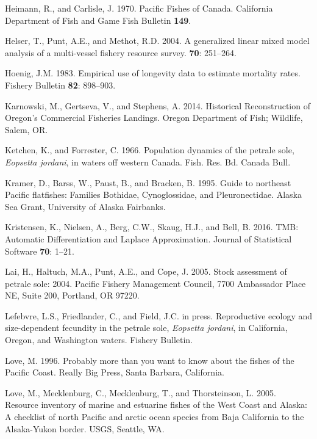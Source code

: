 \documentclass[12pt,]{article}
\begin{document}
\hypertarget{ref-heimann_pacific_1970}{}
Heimann, R., and Carlisle, J. 1970. Pacific Fishes of Canada. California
Department of Fish and Game Fish Bulletin \textbf{149}.

\hypertarget{ref-helser_generalized_2004}{}
Helser, T., Punt, A.E., and Methot, R.D. 2004. A generalized linear
mixed model analysis of a multi-vessel fishery resource survey.
\textbf{70}: 251--264.

\hypertarget{ref-hoenig_empirical_1983}{}
Hoenig, J.M. 1983. Empirical use of longevity data to estimate mortality
rates. Fishery Bulletin \textbf{82}: 898--903.

\hypertarget{ref-karnowski_historical_2014}{}
Karnowski, M., Gertseva, V., and Stephens, A. 2014. Historical
Reconstruction of Oregon's Commercial Fisheries Landings. Oregon
Department of Fish; Wildlife, Salem, OR.

\hypertarget{ref-ketchen_population_1966}{}
Ketchen, K., and Forrester, C. 1966. Population dynamics of the petrale
sole, \emph{Eopsetta jordani}, in waters off western Canada. Fish. Res.
Bd. Canada Bull.

\hypertarget{ref-kramer_guide_1995}{}
Kramer, D., Barss, W., Paust, B., and Bracken, B. 1995. Guide to
northeast Pacific flatfishes: Families Bothidae, Cynoglossidae, and
Pleuronectidae. Alaska Sea Grant, University of Alaska Fairbanks.

\hypertarget{ref-kristensen_tmb:_2016}{}
Kristensen, K., Nielsen, A., Berg, C.W., Skaug, H.J., and Bell, B. 2016.
TMB: Automatic Differentiation and Laplace Approximation. Journal of
Statistical Software \textbf{70}: 1--21.

\hypertarget{ref-lai_stock_2005}{}
Lai, H., Haltuch, M.A., Punt, A.E., and Cope, J. 2005. Stock assessment
of petrale sole: 2004. Pacific Fishery Management Council, 7700
Ambassador Place NE, Suite 200, Portland, OR 97220.

\hypertarget{ref-lefebvre_reproductive_nodate}{}
Lefebvre, L.S., Friedlander, C., and Field, J.C. in press. Reproductive
ecology and size-dependent fecundity in the petrale sole, \emph{Eopsetta
jordani}, in California, Oregon, and Washington waters. Fishery
Bulletin.

\hypertarget{ref-love_milton_probably_1996}{}
Love, M. 1996. Probably more than you want to know about the fishes of
the Pacific Coast. Really Big Press, Santa Barbara, California.

\hypertarget{ref-love_milton_resource_2005}{}
Love, M., Mecklenburg, C., Mecklenburg, T., and Thorsteinson, L. 2005.
Resource inventory of marine and estuarine fishes of the West Coast and
Alaska: A checklist of north Pacific and arctic ocean species from Baja
California to the Alsaka-Yukon border. USGS, Seattle, WA.
\end{document}
